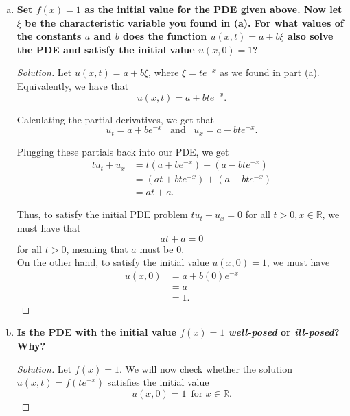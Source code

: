 \documentclass[11pt]{article}
\newenvironment{solution}
  {\renewcommand\qedsymbol{$\blacksquare$}\begin{proof}[Solution]}
  {\end{proof}}
\begin{document}
\begin{enumerate}[(a)]
    \begin{solution}
      We set $f(x) = x$ as per the instructions. We will now check whether the solution $u(x, t) = f(te^{-x})$ satisfies the initial value
      \[ u(x, 0) = x \, \, \, \text{for } x \in \mathbb{R}.\]
  
      Plugging in $t=0$ to our solution, we get that \[ u(x, 0) = 0 \text{ for } x \in \mathbb{R} \]
  
      However, notice that to satisfy the initial condition, we must have that $u(x, 0) = f(x) = x$ for $x\in \mathbb{R}$. \\
  
      Clearly, \[ u(x, 0) = 0 \neq x \text{ for } x \in \mathbb{R}, \] and so the solution we found in (a) does not satisfy the initial value for the PDE.
      \end{solution}
    
    \item \textbf{Set $f(x) = 1$ as the initial value for the PDE given above. Now let $\xi$ be the characteristic variable you found in (a). 
    For what values of the constants $a$ and $b$ does the function $u(x, t) = a + b\xi$ also solve the PDE and satisfy the initial value $u(x,0) = 1$?}
    
    \begin{solution}
    Let $u(x, t) = a + b\xi$, where $\xi = te^{-x}$ as we found in part (a). Equivalently, we have that
    \[ u(x, t) = a + bte^{-x}.\]

    Calculating the partial derivatives, we get that \[ u_t = a + be^{-x} \,\,\, \text { and } \,\,\, u_x = a-bte^{-x}.\]

    Plugging these partials back into our PDE, we get
    \begin{align*} tu_t + u_x &= t\left( a+be^{-x}\right) + \left(a-bte^{-x}\right) \\
      &= \left(at + bte^{-x}\right) + \left(a - bte^{-x} \right) \\
      &= at + a.
    \end{align*}

    Thus, to satisfy the initial PDE problem $tu_t + u_x = 0$ for all $t  > 0, x \in \mathbb{R}$, we must have that \[at + a = 0\] for all $t > 0$, meaning that $a$ must be $0$. \\

    On the other hand, to satisfy the initial value $u(x, 0) = 1$, we must have
    \begin{align*} u(x, 0) &= a + b(0)e^{-x} \\
      &= a \\
      &= 1.\end{align*}
    \end{solution}
    \item \textbf{Is the PDE with the initial value $f(x) = 1$ \textit{well-posed} or \textit{ill-posed}? Why?}
    \begin{solution}
      Let $f(x) = 1$. We will now check whether the solution $u(x, t) = f(te^{-x})$ satisfies the initial value
      \[ u(x, 0) = 1 \, \, \, \text{for } x \in \mathbb{R}.\]
  

\end{solution}
\end{enumerate}
\end{document}
